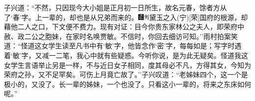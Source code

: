子兴道：``不然，只因现今大小姐是正月初一日所生，故名元春，馀者方从了`春'字。上一辈的，却也是从兄弟而来的。{\includegraphics[width=3mm]{../Images/00006}\includegraphics[width=3mm]{../Images/00011}\footnotesize \kaishu 黛玉之入{(宁)}{[}荣{]}国府的根源，却藉他二人之口，下文便不费力。}现有对证：目今你贵东家林公之夫人，即荣府中赦、政二公之胞妹，在家时名唤贾敏。不信时，你回去细访可知。''雨村拍案笑道：``怪道这女学生读至凡书中有`敏'字，他皆念作`密'字，每每如是；写字时遇着`敏'字，又减一二笔，我心中就有些疑惑。今听你说，是为此无疑矣。怪道我这女学生言语举止另是一样，不与近日女子相同，度其母必不凡，方得其女，今知为荣府之孙，又不足罕矣。可伤上月竟亡故了。''子兴叹道：``老姊妹四个，这一个是极小的，又没了。长一辈的姊妹，一个也没了。只看这小一辈的，将来之东床如何呢。''

